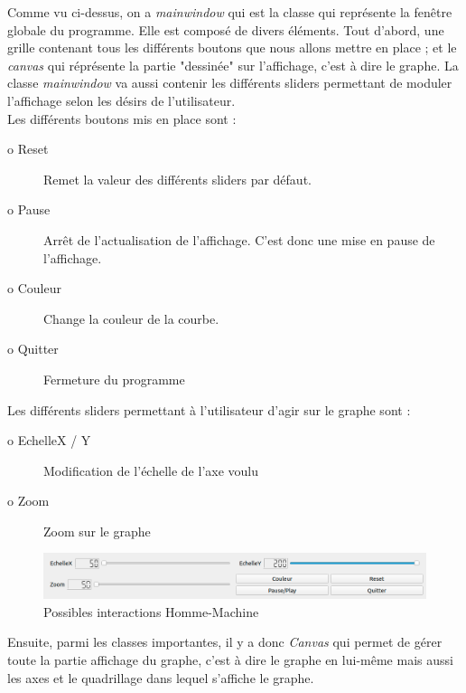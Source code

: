 \documentclass[11pt, french]{article}
\begin{document}
\newpage

Comme vu ci-dessus, on a \emph{mainwindow} qui est la classe qui représente la fenêtre globale du programme. Elle est composé de divers éléments. Tout d'abord, une grille contenant tous les différents boutons que nous allons mettre en place ; et le \emph{canvas} qui réprésente la partie "dessinée" sur l'affichage, c'est à dire le graphe. La classe \emph{mainwindow} va aussi contenir les différents sliders permettant de moduler l'affichage selon les désirs de l'utilisateur.\\

Les différents boutons mis en place sont : 

\begin{description}
    \item [ o Reset ] Remet la valeur des différents sliders par défaut.
    
    \item[ o Pause ] Arrêt de l'actualisation de l'affichage. C'est donc une mise en pause de l'affichage.
    
    \item[ o Couleur ] Change la couleur de la courbe.
    
    \item[ o Quitter ] Fermeture du programme\\

\end{description}

Les différents sliders permettant à l'utilisateur d'agir sur le graphe sont : 

\begin{description}
    \item[ o EchelleX / Y ] Modification de l'échelle de l'axe voulu
    \item[ o Zoom ] Zoom sur le graphe
\end{description}

\vspace*{0.1cm}
\begin{figure}[htb]
\centering
\includegraphics[width=17cm]{boutons.png}
\caption{Possibles interactions Homme-Machine}
\label{fig:slots}
\end{figure}
\vspace*{0.1cm}

Ensuite, parmi les classes importantes, il y a donc \emph{Canvas} qui permet de gérer toute la partie affichage du graphe, c'est à dire le graphe en lui-même mais aussi les axes et le quadrillage dans lequel s'affiche le graphe.\\
\end{document}
